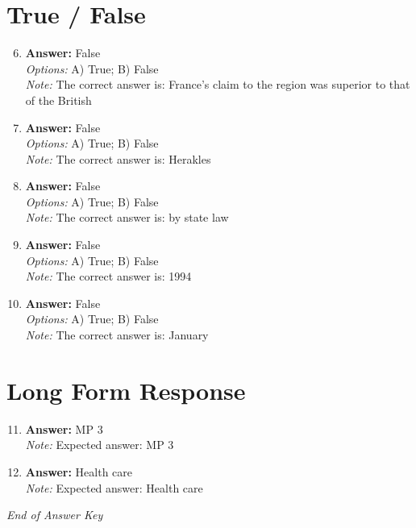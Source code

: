 \documentclass[12pt]{article}
\begin{document}
\section*{True / False}
\begin{enumerate}[label=\arabic*.]
\setcounter{enumi}{5}
\item \textbf{Answer:} False
\\ \textit{Options:} A) True; B) False
\\ \textit{Note:} The correct answer is: France's claim to the region was superior to that of the British
\item \textbf{Answer:} False
\\ \textit{Options:} A) True; B) False
\\ \textit{Note:} The correct answer is: Herakles
\item \textbf{Answer:} False
\\ \textit{Options:} A) True; B) False
\\ \textit{Note:} The correct answer is: by state law
\item \textbf{Answer:} False
\\ \textit{Options:} A) True; B) False
\\ \textit{Note:} The correct answer is: 1994
\item \textbf{Answer:} False
\\ \textit{Options:} A) True; B) False
\\ \textit{Note:} The correct answer is: January
\end{enumerate}

\section*{Long Form Response}
\begin{enumerate}[label=\arabic*.]
\setcounter{enumi}{10}
\item \textbf{Answer:} MP 3
\\ \textit{Note:} Expected answer: MP 3
\item \textbf{Answer:} Health care
\\ \textit{Note:} Expected answer: Health care
\end{enumerate}

\vfill
\noindent\textit{End of Answer Key}
\end{document}
